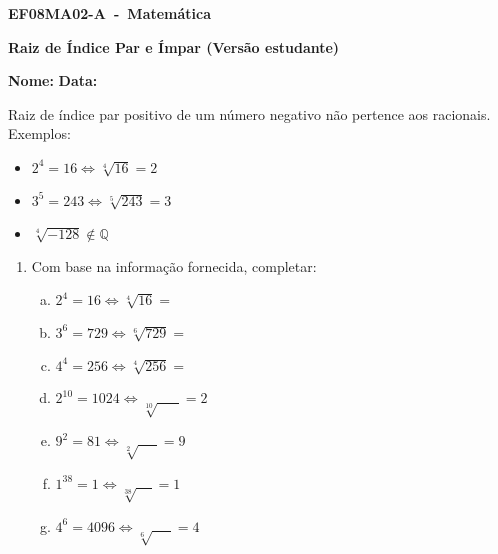 \documentclass[a4paper,14pt]{article}
\begin{document}
	
	\noindent\textbf{EF08MA02-A~-~Matemática} 
	
	\begin{center}
		\textbf{Raiz de Índice Par e Ímpar (Versão estudante)}
	\end{center}
	
	\bigskip
	
	\noindent\textbf{Nome:} \underline{\hspace{10cm}}
    \noindent\textbf{Data:} \underline{\hspace{4cm}}
	
	\bigskip
	
	\begin{multicols}{2}
        \noindent Raiz de índice par positivo de um número negativo não pertence aos racionais. \\
        Exemplos:
    \begin{itemize}
    	\item $2^4 = 16 \Leftrightarrow \sqrt[4]{16} = 2$
    	\item $3^5 = 243 \Leftrightarrow \sqrt[5]{243} = 3$
    	\item $\sqrt[4]{-128} \notin \mathbb{Q}$
    \end{itemize}
	\begin{enumerate}
		
		\item Com base na informação fornecida, completar:
		\begin{enumerate}[a)]
			\item $2^4 = 16 \Leftrightarrow \sqrt[4]{16} = $
			\item $3^6 = 729 \Leftrightarrow \sqrt[6]{729} = $
			\item $4^4 = 256 \Leftrightarrow \sqrt[4]{256} = $
			\item $2^{10} = 1024 \Leftrightarrow \sqrt[10]{~~~~~~~} = 2$
			\item $9^2 = 81 \Leftrightarrow \sqrt[2]{~~~~~~} = 9$
			\item $1^{38} = 1 \Leftrightarrow \sqrt[38]{~~~~~} = 1$
			\item $4^6 = 4096 \Leftrightarrow \sqrt[6]{~~~~~~} = 4$
	    \end{enumerate}
    

\end{enumerate}
\end{multicols}
\end{document}
